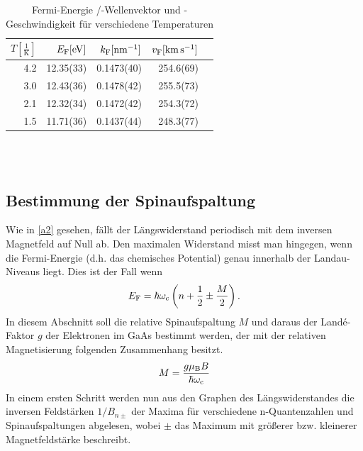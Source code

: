 \documentclass[paper=a4,fontsize=10pt,DIV=18,twocolumn,parskip=half]{scrartcl}
\numberwithin{equation}{section}    %
\begin{document}
\begin{table}[htp]
	\begin{center}
		\begin{tabular}{rrrrr}
			\hline
			$T[\frac{1}{\mathrm{K}}]$ & $E_{\rm F}[\mathrm{eV}]$ & $k_{\rm F}[\SI{}{\per\nano\meter}]$ & $v_{\rm F}[\SI{}{\kilo\meter\per\second}]$\\
			\hline
			4.2 &12.35(33)	&0.1473(40)&	254.6(69)\\
			3.0 &12.43(36)	&0.1478(42)&	255.5(73)\\
			2.1 &12.32(34)	&0.1472(42)&	254.3(72)\\
			1.5 &11.71(36)	&0.1437(44)&	248.3(77)\\
			\hline
		\end{tabular}
		\caption{Fermi-Energie /-Wellenvektor und -Geschwindigkeit für verschiedene Temperaturen}
		\label{fermitabelle}
	\end{center}
\end{table}
%
~~~~~~~~~~~~~~~~~~~~~~~~~~~~~~~~~~~~~~~~~~~~~~~~~~~~~~~~~~~~~~~~~~~~~~~~~~~~~
\subsection{Bestimmung der Spinaufspaltung}
\label{a6}
Wie in \ref{a2} gesehen, fällt der Längswiderstand periodisch mit dem inversen Magnetfeld auf Null ab. Den maximalen Widerstand misst man hingegen, wenn die Fermi-Energie (d.h. das chemisches Potential) genau innerhalb der Landau-Niveaus liegt. Dies ist der Fall wenn
\begin{equation}
E_{\rm F}=\hbar \omega_{\rm c}\left( n+\frac{1}{2}\pm\frac{M}{2}\right).
\end{equation}
In diesem Abschnitt soll die relative Spinaufspaltung $M$ und daraus der Landé-Faktor $g$ der Elektronen im GaAs bestimmt werden, der mit der relativen Magnetisierung folgenden Zusammenhang besitzt.
\begin{equation}
M=\frac{g \mu_{\rm B} B}{\hbar \omega_{\rm c}}
\label{lande}
\end{equation}
In einem ersten Schritt werden nun aus den Graphen des Längswiderstandes die inversen Feldstärken $1/B_{n\pm}$ der Maxima für verschiedene n-Quantenzahlen und Spinaufspaltungen abgelesen, wobei $\pm$ das Maximum mit größerer bzw. kleinerer Magnetfeldstärke beschreibt.
\end{document}
